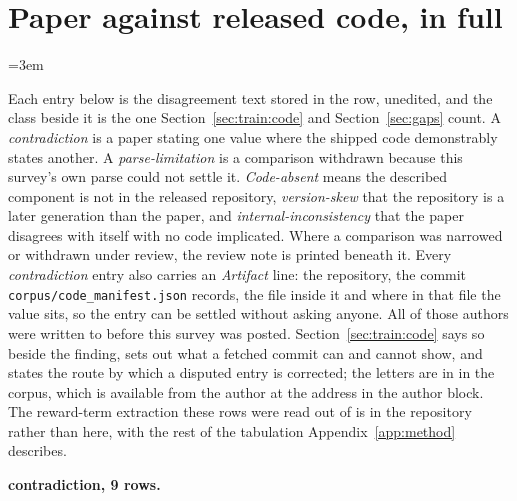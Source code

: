 \section{Paper against released code, in full}
\label{app:rewards}
\begingroup\sloppy
\emergencystretch=3em

Each entry below is the disagreement text stored in the row, unedited, and the class beside it
is the one Section~\ref{sec:train:code} and Section~\ref{sec:gaps} count. A
\emph{contradiction} is a paper stating one value where the shipped code demonstrably states
another. A \emph{parse-limitation} is a comparison withdrawn because this survey's own parse
could not settle it. \emph{Code-absent} means the described component is not in the released
repository, \emph{version-skew} that the repository is a later generation than the paper, and
\emph{internal-inconsistency} that the paper disagrees with itself with no code implicated.
Where a comparison was narrowed or withdrawn under review, the review note is printed beneath
it. Every \emph{contradiction} entry also carries an \emph{Artifact} line: the repository, the
commit \texttt{corpus/code\_manifest.json} records, the file inside it and where in that file
the value sits, so the entry can be settled without asking anyone. All of those authors were
written to before this survey was posted. Section~\ref{sec:train:code} says so beside the
finding, sets out what a fetched commit can and cannot show, and states the route by which a
disputed entry is corrected; the letters are in  in the corpus, which is
available from the author at the address in the author block. The reward-term extraction these
rows were read out of is in the repository rather than here, with the rest of the tabulation
Appendix~\ref{app:method} describes.

\textbf{contradiction, 9 rows.}


